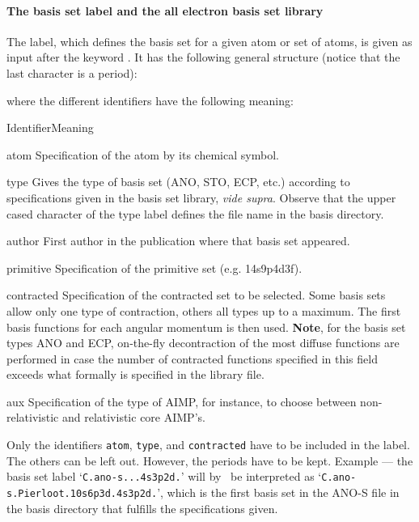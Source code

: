 \paragraph{The basis set label and the all electron basis set library}

The label, which defines the basis set for a given atom or set of atoms,
is given as input after the
keyword . It has the following general
structure (notice that the last
character is a period):


where the different identifiers have the following meaning:

\begin{whatnotlist}{\tt}{Identifier}{Meaning}
\item[atom]
Specification of the atom by its chemical symbol.
\item[type]
Gives the type of basis set (ANO, STO, ECP, etc.) according to
specifications given in the basis set library, {\em vide supra}.
Observe that the upper cased character of the type label
defines the file name in the basis directory.
\item[author]
First author in the publication where that basis set appeared.
\item[primitive]
Specification of the primitive set (e.g. 14s9p4d3f).
\item[contracted]
Specification of the contracted set to be selected. Some basis
sets allow only one type of contraction, others all types up
to a maximum. The first basis functions for each angular
momentum is then used.
{\bf Note}, for the basis set types ANO and ECP, on-the-fly decontraction of the most
diffuse functions are performed in case the number of contracted functions specified in this field
exceeds what formally is specified in the library file.
\item[aux]
Specification of the type of AIMP, for instance, to choose between
non-relativistic and relativistic core AIMP's.
\end{whatnotlist}
Only the identifiers \verb+atom+, \verb+type+,
and \verb+contracted+ have to be included in
the label. The others can be left out. However, the periods have to be
kept. Example --- the basis set label
`\verb+C.ano-s...4s3p2d.+'
will by \molcas\ be
interpreted as
`\verb+C.ano-s.Pierloot.10s6p3d.4s3p2d.+',
which is the first
basis set in the ANO-S file in the
basis directory that fulfills the specifications given.

